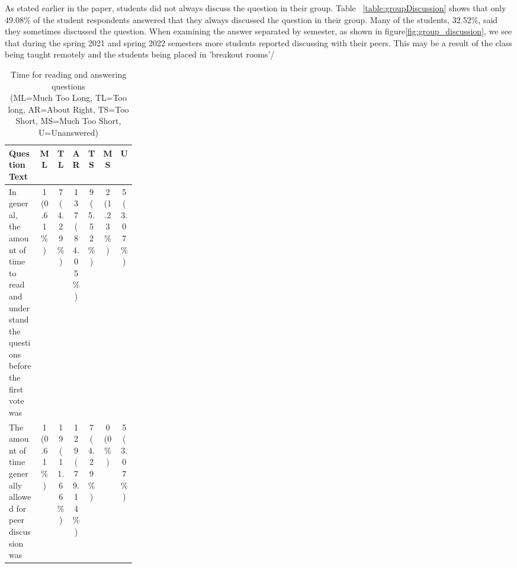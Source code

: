 \documentclass[12pt]{article}
\begin{document}
As stated earlier in the paper, students did not always discuss the question in their group. Table ~\ref{table:groupDiscussion} shows that only 49.08\% of the student respondents answered that they always discussed the question in their group. Many of the students, 32.52\%, said they sometimes discussed the question. When examining the answer separated by semester, as shown in figure\ref{fig:group_discussion}, we see that during the spring 2021 and spring 2022 semesters more students reported discussing with their peers.  This may be a result of the class being taught remotely and the students being placed in 'breakout rooms'/


\begin{table}[ht]
\label{table:timeForQuestions}
\begin{tabular}{p{0.25\linewidth} |c|c|c|c|c|c} %
\toprule
Question Text & ML & TL & AR & TS & MS & U \\ \midrule
\rowcolor{LightGray}%
In general, the amount of time to read and understand the questions before the first vote was 
& \specialcell{  1 \\ (0.61\%) }
& \specialcell{ 7 \\ (4.29\%) }
& \specialcell{ 137 \\ (84.05\%) }
& \specialcell{ 9 \\ (5.52\%) }
& \specialcell{ 2 \\ (1.23\%) }
& \specialcell{ 5 \\ (3.07\%) }
\\ \midrule %
The amount of time generally allowed for peer discussion was 
& \specialcell{1 \\(0.61\%) }
& \specialcell{19 \\(11.66\%) } 
& \specialcell{129 \\(79.14\%) } 
& \specialcell{7 \\(4.29\%) }
& \specialcell{0 \\(0\%) }
& \specialcell{5 \\(3.07\%) }\\ \bottomrule
\end{tabular}
\caption{Time for reading and answering questions\\\hspace{\textwidth} (ML=Much Too Long, TL=Too long, AR=About Right, TS=Too Short, MS=Much Too Short, U=Unanswered)}
\end{table}
\end{document}
